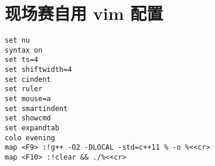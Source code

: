 \section*{现场赛自用 vim 配置}

\begin{verbatim}
set nu
syntax on
set ts=4
set shiftwidth=4
set cindent
set ruler
set mouse=a
set smartindent
set showcmd
set expandtab
colo evening
map <F9> :!g++ -O2 -DLOCAL -std=c++11 % -o %<<cr>
map <F10> :!clear && ./%<<cr>
\end{verbatim}